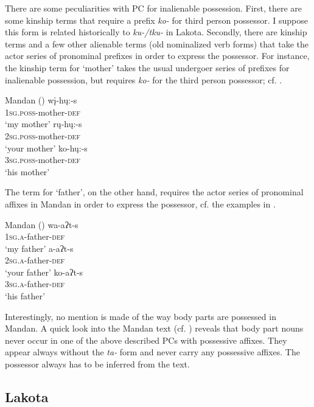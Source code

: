 \documentclass[output=paper]{LSP/langsci}
\begin{document}
There are some peculiarities with PC for inalienable possession. First, there are some kinship terms that require a prefix \textit{ko-} for third person possessor. I suppose this form is related historically to \textit{ku-/tku-} in Lakota. Secondly, there are kinship terms and a few other alienable terms (old nominalized verb forms) that take the actor series of pronominal prefixes in order to express the possessor. For instance, the kinship term for `mother' takes the usual undergoer series of prefixes for inalienable possession, but requires \textit{ko-} for the third person possessor; cf. . 

\ea Mandan (\citealt[45]{Mixco1997a}) \label{mandanmother}
\ea
\gll wį-hų:-s \\			
\textsc{1sg.poss}-mother-\textsc{def} \\
\glt `my mother'
\ex \gll rų-hų:-s \\
\textsc{2sg.poss}-mother-\textsc{def} \\
\glt `your mother'
\ex \gll ko-hų:-s \\
\textsc{3sg.poss}-mother-\textsc{def} \\
\glt `his mother'
\z \z

The term for `father', on the other hand, requires the actor series of pronominal affixes in Mandan in order to express the possessor, cf. the examples in .

\ea Mandan (\citealt[45]{Mixco1997a}) \label{mandanfather}
\ea \gll wa-aʔt-s \\
\textsc{1sg.a}-father-\textsc{def} \\
\glt `my father'
\ex \gll a-aʔt-s \\
\textsc{2sg.a}-father-\textsc{def} \\
\glt `your father'
\ex \gll ko-aʔt-s \\
\textsc{3sg.a}-father-\textsc{def} \\
\glt `his father'
\z \z

Interestingly, no mention is made of the way body parts are possessed in Mandan. A quick look into the Mandan text (cf. \citealt[66ff]{Mixco1997a}) reveals that body part nouns never occur in one of the above described PCs with possessive affixes. They appear always without the \textit{ta-} form and never carry any possessive affixes. The possessor always has to be inferred from the text.
 
\subsection{Lakota}\label{sec:helmbrecht:4.4} \label{lakota} 
\end{document}
